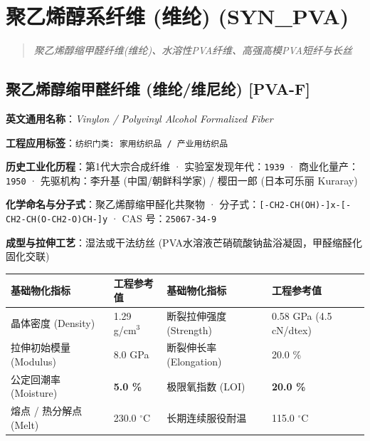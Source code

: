 \documentclass[11pt,openright,twoside,UTF8]{ctexbook}
\begin{document}
\chapter{聚乙烯醇系纤维 (维纶) (SYN\_PVA)}
\begin{quote}
\small\itshape
聚乙烯醇缩甲醛纤维(维纶)、水溶性PVA纤维、高强高模PVA短纤与长丝
\end{quote}

\section{聚乙烯醇缩甲醛纤维 (维纶/维尼纶) [PVA-F]}
\label{sec:pva-f}

\noindent\textbf{英文通用名称}：\textit{Vinylon / Polyvinyl Alcohol Formalized Fiber}\par
\noindent\textbf{工程应用标签}：\texttt{纺织门类: 家用纺织品 / 产业用纺织品}\par
\noindent\textbf{历史工业化历程}：第1代大宗合成纤维 · 实验室发现年代：\texttt{1939} · 商业化量产：\texttt{1950} · 先驱机构：李升基 (中国/朝鲜科学家) / 樱田一郎 (日本可乐丽 Kuraray)\par
\noindent\textbf{化学命名与分子式}：聚乙烯醇缩甲醛化共聚物 · 分子式：\texttt{[-CH2-CH(OH)-]x-[-CH2-CH(O-CH2-O)CH-]y} · CAS 号：\texttt{25067-34-9}\par
\noindent\textbf{成型与拉伸工艺}：湿法或干法纺丝 (PVA水溶液芒硝硫酸钠盐浴凝固，甲醛缩醛化固化交联)\par

\vspace{0.15cm}
\begin{center}
\small
\begin{tabularx}{\textwidth}{p{3.8cm}Xp{3.8cm}X}
\toprule
\textbf{基础物化指标} & \textbf{工程参考值} & \textbf{基础物化指标} & \textbf{工程参考值} \\
\midrule
晶体密度 (Density) & 1.29 g/cm$^3$ & 断裂拉伸强度 (Strength) & 0.58 GPa (4.5 cN/dtex) \\
拉伸初始模量 (Modulus) & 8.0 GPa & 断裂伸长率 (Elongation) & 20.0 \% \\
公定回潮率 (Moisture) & \textbf{5.0 \%} & 极限氧指数 (LOI) & \textbf{20.0 \%} \\
熔点 / 热分解点 (Melt) & 230.0 $^\circ\mathrm{C}$ & 长期连续服役耐温 & 115.0 $^\circ\mathrm{C}$ \\
\bottomrule
\end{tabularx}
\end{center}
\vspace{0.15cm}
\end{document}
